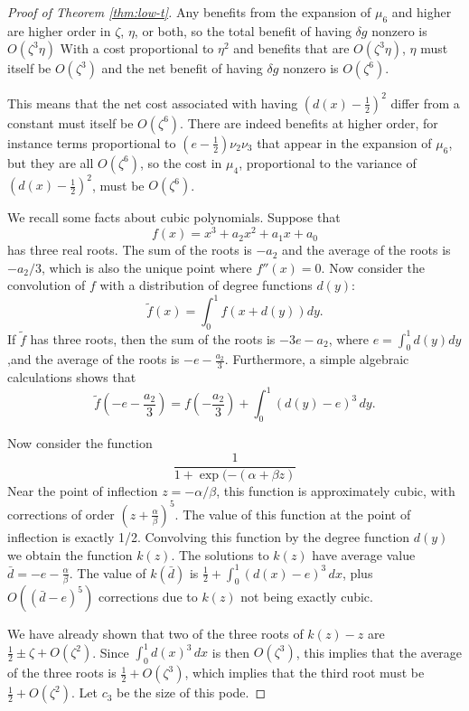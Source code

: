 \documentclass[10pt,a4paper]{amsart}
\begin{document}
\begin{proof}[Proof of Theorem \ref{thm:low-t}]
Any benefits from the 
expansion of $\mu_6$ and higher are higher order in $\zeta$, $\eta$, or both, so the total benefit of having 
$\delta g$ nonzero is $O(\zeta^3\eta)$
With a cost proportional to 
$\eta^2$ and benefits that are $O(\zeta^3\eta)$, $\eta$ must itself be $O(\zeta^3)$ and the net benefit of having 
$\delta g$ nonzero is $O(\zeta^6)$. 

This means that the net cost associated with having $(d(x)-\frac12)^2$ differ from a constant must itself be $O(\zeta^6)$. 
There are indeed benefits at higher order, for instance terms proportional to $(e-\frac12) \nu_2\nu_3$ that appear in the
expansion of $\mu_6$, but they are all $O(\zeta^6)$, so the cost in $\mu_4$, proportional to the variance of 
$(d(x)-\frac12)^2$, must be $O(\zeta^6)$. 

\smallskip

 We recall some facts about cubic polynomials. Suppose that 
\begin{equation}
f(x) = x^3 + a_2 x^2 + a_1 x + a_0 
\end{equation}
has three real roots. The sum of the roots is $-a_2$ and the average of the roots is $-a_2/3$, which is also the unique
point where $f''(x)=0$. Now consider the convolution of $f$ with a distribution of degree functions $d(y)$:
\begin{equation}
\tilde f(x) = \int_0^1 f(x+d(y)) dy.
\end{equation}
If $\tilde f$ has three roots, then the sum of the roots is $-3e-a_2$, where $e = \int_0^1 d(y) dy$ ,and the average of 
the roots is $-e - \frac{a_2}{3}$. Furthermore, a simple algebraic calculations shows that 
\begin{equation} 
\tilde f(-e - \frac{a_2}{3}) = f(-\frac{a_2}{3}) + \int_0^1 (d(y)-e)^3 \, dy.
\end{equation}

Now consider the function 
\[ \frac{1}{1 + \exp(-(\alpha + \beta z)} \]
Near the point of inflection $z=-\alpha/\beta$, this function is approximately cubic, with corrections of order 
$(z + \frac{\alpha}{\beta})^5$. The value of this function at the point of inflection is exactly 1/2. 
Convolving this function by the degree function $d(y)$ we obtain the function $k(z)$. The solutions to $k(z)$ have average
value $\bar d = -e - \frac{\alpha}{\beta}$. The value of $k(\bar d)$ is $\frac12 + \int_0^1 (d(x)-e)^3 \, dx$, plus
$O((\bar d-e)^5)$ corrections due to $k(z)$ not being exactly cubic. 

We have already shown that two of the three roots of $k(z)-z$ are $\frac12 \pm \zeta + O(\zeta^2)$. Since 
$\int_0^1 d(x)^3 \, dx$ is then $O(\zeta^3)$, this implies that the average of the three roots is $\frac12 + O(\zeta^3)$,
which implies that the third root must be $\frac12 + O(\zeta^2)$. Let $c_3$ be the size of this pode. 


\end{proof}
\end{document}

